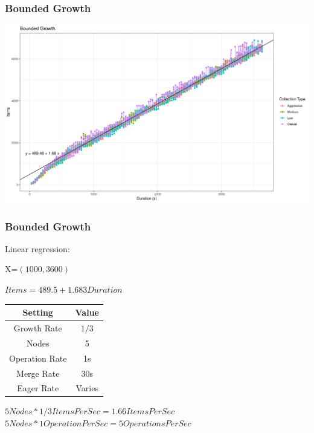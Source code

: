 \documentclass{beamer}
\begin{document}
    \begin{frame}
        \frametitle{Bounded Growth}
        \includegraphics[width=\textwidth]{BoundedGrowth2_2}
    \end{frame}

    \begin{frame}[shrink]
        \frametitle{Bounded Growth}

        Linear regression:

        {\tiny X=$(1000, 3600)$}

        \begin{center}
            $Items = 489.5 + 1.683 Duration$
        \end{center}

        \begin{center}
            \begin{tabular}{ ||c c||}
                \hline
                Setting & Value \\
                \hline
                Growth Rate & $1/3$ \\
                Nodes & 5 \\
                Operation Rate & 1s \\
                Merge Rate & 30s \\
                Eager Rate & Varies \\
                \hline
            \end{tabular}
        \end{center}

        \begin{center}
            $5Nodes*1/3 Items Per Sec = 1.66 Items Per Sec$
            $5Nodes*1 Operation Per Sec = 5 Operations Per Sec$
        \end{center}
    \end{frame}
\end{document}
